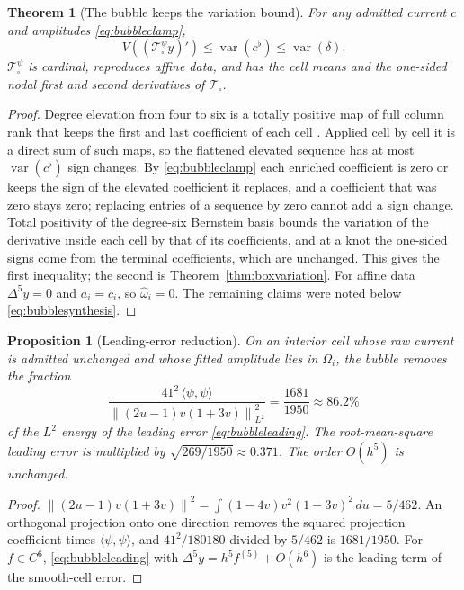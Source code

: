 \documentclass[journal]{IEEEtran}
\newtheorem{theorem}{Theorem}
\newtheorem{proposition}{Proposition}
\newcommand{\Tcal}{\mathcal{T}}
\newcommand{\var}{\operatorname{var}}
\newcommand{\norm}[1]{\left\lVert#1\right\rVert}
\begin{document}
\begin{theorem}[The bubble keeps the variation bound]
\label{thm:bubblevariation}
For any admitted current \(c\) and amplitudes \eqref{eq:bubbleclamp},
\begin{equation}
 V((\Tcal_\square^{\psi}y)')\le\var(c^\flat)\le\var(\delta).
 \label{eq:bubblevardim}
\end{equation}
\(\Tcal_\square^{\psi}\) is cardinal, reproduces affine data, and has the
cell means and the one-sided nodal first and second derivatives of
\(\Tcal_\square\).
\end{theorem}

\begin{proof}
Degree elevation from four to six is a totally positive map of full
column rank that keeps the first and last coefficient of each cell
\cite{pinkus2010}. Applied cell by cell it is a direct sum of such maps,
so the flattened elevated sequence has at most \(\var(c^\flat)\) sign
changes. By \eqref{eq:bubbleclamp} each enriched coefficient is zero or
keeps the sign of the elevated coefficient it replaces, and a
coefficient that was zero stays zero; replacing entries of a sequence by
zero cannot add a sign change. Total positivity of the degree-six
Bernstein basis bounds the variation of the derivative inside each cell
by that of its coefficients, and at a knot the one-sided signs come from
the terminal coefficients, which are unchanged. This gives the first
inequality; the second is Theorem~\ref{thm:boxvariation}. For affine
data \(\Delta^5y=0\) and \(a_i=c_i\), so \(\widehat\omega_i=0\). The
remaining claims were noted below \eqref{eq:bubblesynthesis}.
\end{proof}

\begin{proposition}[Leading-error reduction]
\label{prop:bubblegain}
On an interior cell whose raw current is admitted unchanged and whose
fitted amplitude lies in \(\Omega_i\), the bubble removes the fraction
\begin{equation}
 \frac{41^2\,\langle\psi,\psi\rangle}
 {\norm{(2u-1)v(1+3v)}_{L^2}^2}
 =\frac{1681}{1950}\approx86.2\%
 \label{eq:bubblegain}
\end{equation}
of the \(L^2\) energy of the leading error \eqref{eq:bubbleleading}. The
root-mean-square leading error is multiplied by
\(\sqrt{269/1950}\approx0.371\). The order \(O(h^5)\) is unchanged.
\end{proposition}

\begin{proof}
\(\norm{(2u-1)v(1+3v)}^2=\int(1-4v)v^2(1+3v)^2\,du=5/462\). An
orthogonal projection onto one direction removes the squared projection
coefficient times \(\langle\psi,\psi\rangle\), and
\(41^2/180180\) divided by \(5/462\) is \(1681/1950\). For
\(f\in C^6\), \eqref{eq:bubbleleading} with \(\Delta^5y=h^5f^{(5)}+O(h^6)\)
is the leading term of the smooth-cell error.
\end{proof}
\end{document}
